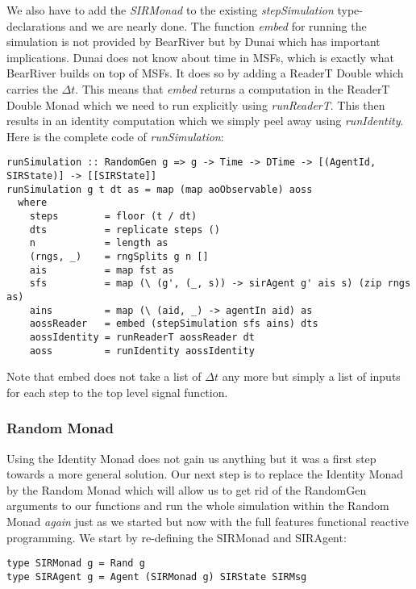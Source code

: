 We also have to add the \textit{SIRMonad} to the existing \textit{stepSimulation} type-declarations and we are nearly done. The function \textit{embed} for running the simulation is not provided by BearRiver but by Dunai which has important implications. Dunai does not know about time in MSFs, which is exactly what BearRiver builds on top of MSFs. It does so by adding a ReaderT Double which carries the $\Delta t$. This means that \textit{embed} returns a computation in the ReaderT Double Monad which we need to run explicitly using \textit{runReaderT}. This then results in an identity computation which we simply peel away using \textit{runIdentity}. Here is the complete code of \textit{runSimulation}:

\begin{verbatim}
runSimulation :: RandomGen g => g -> Time -> DTime -> [(AgentId, SIRState)] -> [[SIRState]]
runSimulation g t dt as = map (map aoObservable) aoss
  where
    steps        = floor (t / dt)
    dts          = replicate steps ()
    n            = length as
    (rngs, _)    = rngSplits g n []
    ais          = map fst as
    sfs          = map (\ (g', (_, s)) -> sirAgent g' ais s) (zip rngs as)
    ains         = map (\ (aid, _) -> agentIn aid) as
    aossReader   = embed (stepSimulation sfs ains) dts
    aossIdentity = runReaderT aossReader dt
    aoss         = runIdentity aossIdentity
\end{verbatim}

Note that embed does not take a list of $\Delta t$ any more but simply a list of inputs for each step to the top level signal function.

\subsubsection{Random Monad}
Using the Identity Monad does not gain us anything but it was a first step towards a more general solution. Our next step is to replace the Identity Monad by the Random Monad which will allow us to get rid of the RandomGen arguments to our functions and run the whole simulation within the Random Monad \textit{again} just as we started but now with the full features functional reactive programming.
We start by re-defining the SIRMonad and SIRAgent:

\begin{verbatim}
type SIRMonad g = Rand g
type SIRAgent g = Agent (SIRMonad g) SIRState SIRMsg
\end{verbatim}

